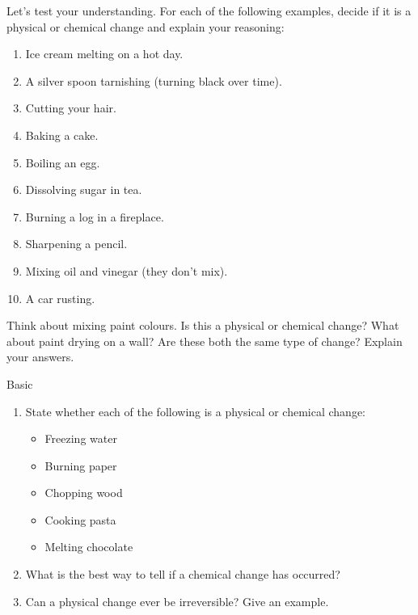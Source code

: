 Let's test your understanding. For each of the following examples, decide if it is a physical or chemical change and explain your reasoning:

\begin{enumerate}
    \item  Ice cream melting on a hot day.
    \item  A silver spoon tarnishing (turning black over time).
    \item  Cutting your hair.
    \item  Baking a cake.
    \item  Boiling an egg.
    \item  Dissolving sugar in tea.
    \item  Burning a log in a fireplace.
    \item  Sharpening a pencil.
    \item  Mixing oil and vinegar (they don't mix).
    \item  A car rusting.
\end{enumerate}

\begin{stopandthink}
Think about mixing paint colours. Is this a physical or chemical change? What about paint drying on a wall? Are these both the same type of change? Explain your answers.
\end{stopandthink}


\begin{tieredquestions}{Basic}
\begin{enumerate}
    \item  State whether each of the following is a physical or chemical change:
        \begin{itemize}
            \item  Freezing water
            \item  Burning paper
            \item  Chopping wood
            \item  Cooking pasta
            \item  Melting chocolate
        \end{itemize}
    \item  What is the best way to tell if a chemical change has occurred?
    \item  Can a physical change ever be irreversible? Give an example.
\end{enumerate}
\end{tieredquestions}

